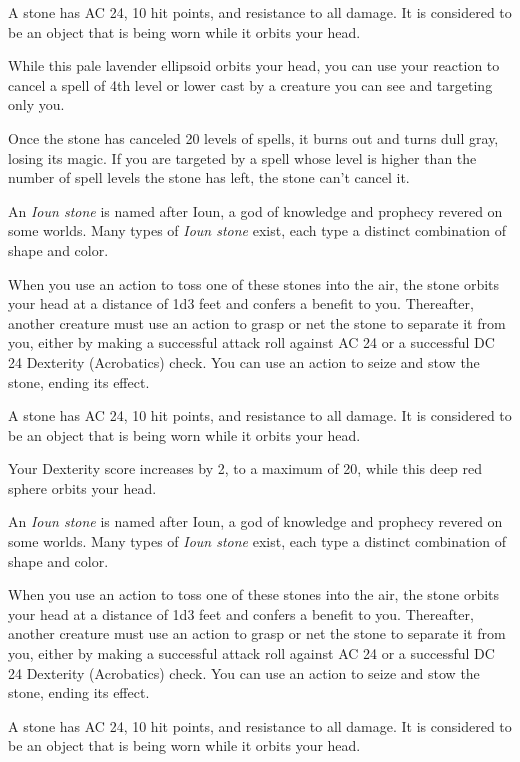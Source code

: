 \documentclass[10pt,a4paper,twoside,bg=print,twocolumn,openany,nodeprecatedcode]{dndbook}
\begin{document}
A stone has AC 24, 10 hit points, and resistance to all damage. It is considered to be an object that is being worn while it orbits your head.

While this pale lavender ellipsoid orbits your head, you can use your reaction to cancel a spell of 4th level or lower cast by a creature you can see and targeting only you.

Once the stone has canceled 20 levels of spells, it burns out and turns dull gray, losing its magic. If you are targeted by a spell whose level is higher than the number of spell levels the stone has left, the stone can't cancel it.

An \textit{Ioun stone} is named after Ioun, a god of knowledge and prophecy revered on some worlds. Many types of \textit{Ioun stone} exist, each type a distinct combination of shape and color.

When you use an action to toss one of these stones into the air, the stone orbits your head at a distance of 1d3 feet and confers a benefit to you. Thereafter, another creature must use an action to grasp or net the stone to separate it from you, either by making a successful attack roll against AC 24 or a successful DC 24 Dexterity (Acrobatics) check. You can use an action to seize and stow the stone, ending its effect.

A stone has AC 24, 10 hit points, and resistance to all damage. It is considered to be an object that is being worn while it orbits your head.

Your Dexterity score increases by 2, to a maximum of 20, while this deep red sphere orbits your head.

An \textit{Ioun stone} is named after Ioun, a god of knowledge and prophecy revered on some worlds. Many types of \textit{Ioun stone} exist, each type a distinct combination of shape and color.

When you use an action to toss one of these stones into the air, the stone orbits your head at a distance of 1d3 feet and confers a benefit to you. Thereafter, another creature must use an action to grasp or net the stone to separate it from you, either by making a successful attack roll against AC 24 or a successful DC 24 Dexterity (Acrobatics) check. You can use an action to seize and stow the stone, ending its effect.

A stone has AC 24, 10 hit points, and resistance to all damage. It is considered to be an object that is being worn while it orbits your head.
\end{document}
